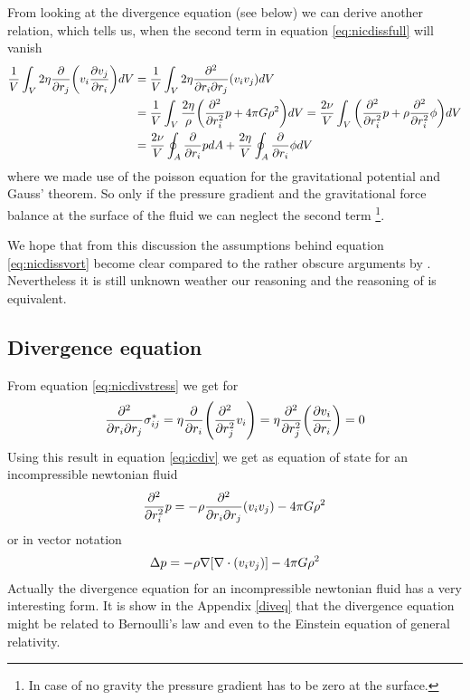 From looking at the divergence equation (see below) we can derive another 
relation, which tells us, when the second term in equation 
\eqref{eq:nicdissfull} will vanish
\begin{align*}
\frac{1}{V} \int_V 2\eta \pd{r_j}\lra{v_i \ppd{r_i}{v_j}} dV 
&=\frac{1}{V} \int_V 2\eta \frac{\partial^2}{\partial r_i \partial r_j}(v_i v_j)dV\\
&= \frac{1}{V} \int_V \frac {2\eta}{\rho}\lra{\pdd{r_i}p  + 4\pi G \rho^2} dV
=  \frac{2 \nu}{V} \int_V \lra{\pdd{r_i}p  + \rho \pdd{r_i}\phi} dV\\
&= \frac{2 \nu}{V} \oint_A \pd{r_i}p dA + \frac{2 \eta}{V} \oint_A \pd{r_i}\phi dV
\end{align*}
where we made use of the poisson equation for the gravitational potential and 
Gauss' theorem. So only if the pressure gradient and the gravitational force 
balance at the surface of the fluid we can neglect the second term \footnote{In 
case of no gravity the pressure gradient has to be zero at the surface.}. 

We hope that from this discussion the assumptions behind equation 
\eqref{eq:nicdissvort}
become clear compared to the rather obscure arguments by \citet{Frisch1995}. 
Nevertheless it is still unknown weather our reasoning and the reasoning of 
\citet{Frisch1995} is 
equivalent.

\subsection{Divergence equation}
From equation \eqref{eq:nicdivstress} we get for
\begin{align}
\frac{\partial^2}{\partial r_i \partial r_j}\sigma^*_{ij} 
= \eta \pd{r_i} \lra{\pdd{r_j}v_i} 
= \eta \pdd{r_j} \lra{\ppd{r_i}{v_i}} 
= 0
\end{align}
Using this result in equation \eqref{eq:icdiv} we get as equation of state for
an incompressible newtonian fluid
\begin{align}
\pdd{r_i}p= 
-\rho \frac{\partial^2}{\partial r_i \partial r_j}(v_i v_j)
-4\pi G \rho^2
\end{align}
or in vector notation
\begin{align}
\Delta p = 
-\rho \nabla\lrb{\nabla\cdot(v_i v_j)}
- 4\pi G \rho^2
\end{align}
Actually the divergence equation for an incompressible newtonian fluid 
has a very interesting form. It is show in the Appendix \ref{diveq} that the 
divergence equation might be related to Bernoulli's law and even to the 
Einstein equation of general relativity.  
 
